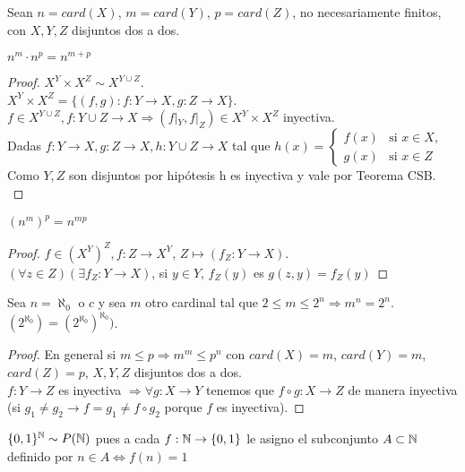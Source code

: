 Sean $n = card(X)$, $m = card(Y)$, $p = card(Z)$, no necesariamente finitos, con $X, Y, Z$ disjuntos dos a dos.

\begin{prop}
  $n^m \cdot n^p = n^{m+p}$ \\
  \begin{proof}
    $X^Y \times X^Z \sim X^{Y \cup Z}$. \\
    $X^Y \times X^Z = \{ (f, g) : f: Y \to X, g: Z \to X \}$. \\
    $f \in X^{Y \cup Z}, f: Y \cup Z \to X \Rightarrow (f|_Y, f|_Z) \in X^Y \times X^Z$ inyectiva. \\
    Dadas $f: Y \to X, g: Z \to X, h: Y \cup Z \to X$ tal que $h(x) = \begin{cases}
        f(x) & \text{si } x \in X, \\
        g(x) & \text{si } x \in Z
      \end{cases}$ \\
    Como $Y, Z$ son disjuntos por hipótesis h es inyectiva y vale por Teorema CSB. \\
  \end{proof}
\end{prop}

\begin{prop}
  $(n^m)^p = n^{mp}$
  \begin{proof}
    $f \in (X^Y)^Z, f: Z \to X^Y$, $Z \mapsto (f_Z: Y \to X)$. \\
    $(\forall z \in Z)(\exists f_Z: Y \to X)$, si $y \in Y$, $f_Z(y)$ es $g(z, y) = f_Z(y)$
  \end{proof}
\end{prop}

\begin{theorem}
  Sea $n = \aleph_0$ o $c$ y sea $m$ otro cardinal tal que $2 \leq m \leq 2^n \Rightarrow m^n = 2^n$. $(2^{\aleph_0}) = (2^{\aleph_0})^{\aleph_0})$.
  \begin{proof}
    En general si $m \leq p \Rightarrow m^m \leq p^n$ con $card(X) = m$, $card(Y) = m$, $card(Z) = p$, $X,Y,Z$ disjuntos dos a dos. \\
    $f: Y \to Z$ es inyectiva $\Rightarrow \forall g: X \to Y$ tenemos que $f \circ g: X \to Z$ de manera inyectiva (si $g_1 \neq g_2 \to f = g_1 \neq f \circ g_2$ porque $f$ es inyectiva).
  \end{proof}
\end{theorem}

\begin{note}
  $\{ 0, 1 \}^{\mathbb{N}} \sim P(\mathbb{N})$ pues a cada $f: \mathbb{N} \to \{0, 1\}$ le asigno el subconjunto $A \subset \mathbb{N}$ definido por $n \in A \iff f(n) = 1$
\end{note}

